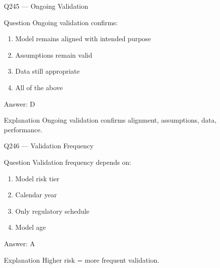 \documentclass[aspectratio=169,8pt]{beamer}
\begin{document}
								\begin{frame}{Q245 --- Ongoing Validation}
									\begin{block}{Question}
										Ongoing validation confirms:
										\begin{enumerate}
											\item Model remains aligned with intended purpose
											\item Assumptions remain valid
											\item Data still appropriate
											\item All of the above
										\end{enumerate}
									\end{block}
									\begin{exampleblock}{Answer: D}\end{exampleblock}
									\begin{block}{Explanation}
										Ongoing validation confirms alignment, assumptions, data, performance.
									\end{block}
								\end{frame}
								
								\begin{frame}{Q246 --- Validation Frequency}
									\begin{block}{Question}
										Validation frequency depends on:
										\begin{enumerate}
											\item Model risk tier
											\item Calendar year
											\item Only regulatory schedule
											\item Model age
										\end{enumerate}
									\end{block}
									\begin{exampleblock}{Answer: A}\end{exampleblock}
									\begin{block}{Explanation}
										Higher risk = more frequent validation.
									\end{block}
								\end{frame}
								
\end{document}
